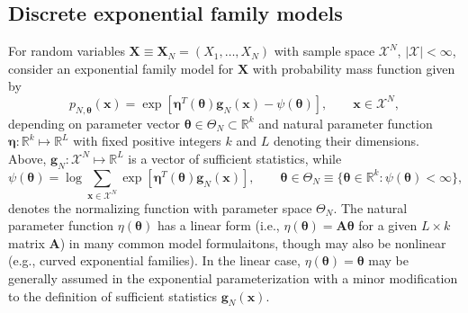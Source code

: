 \documentclass[]{article}
\theoremstyle{definition}
\begin{document}
\subsection{Discrete exponential family
models}\label{discrete-exponential-family-models}

For random variables
\(\boldsymbol X \equiv\boldsymbol X_N= (X_1, \dots, X_N)\) with sample
space \(\mathcal{X}^N\), \(|\mathcal{X}| < \infty\), consider an
exponential family model for \(\boldsymbol X\) with probability mass
function given by
\begin{equation}
\label{eq:expo}
p_{N, \boldsymbol \theta}(\boldsymbol x) = \exp\left[\boldsymbol\eta^T(\boldsymbol \theta) \boldsymbol g_N(\boldsymbol x) - \psi(\boldsymbol \theta)\right], \qquad \boldsymbol x \in \mathcal{X}^N,
\end{equation}
depending on parameter vector
\(\boldsymbol \theta \in \Theta_N \subset \mathbb{R}^{k}\) and natural
parameter function
\(\boldsymbol \eta : \mathbb{R}^k \mapsto \mathbb{R}^L\) with fixed
positive integers \(k\) and \(L\) denoting their dimensions. Above,
\(\boldsymbol g_N : \mathcal{X}^N \mapsto \mathbb{R}^L\) is a vector of
sufficient statistics, while \[
\psi(\boldsymbol \theta) = \log \sum\limits_{\boldsymbol x \in \mathcal{X}^N}\exp\left[\boldsymbol \eta^T(\boldsymbol \theta) \boldsymbol g_N(\boldsymbol x) \right], \qquad \boldsymbol \theta \in \Theta_N\equiv \{\boldsymbol \theta \in \mathbb{R}^k : \psi(\boldsymbol \theta) < \infty \},
\] denotes the normalizing function with parameter space \(\Theta_N\).
The natural parameter function \(\eta (\boldsymbol \theta)\) has a
linear form (i.e.,
\(\eta (\boldsymbol \theta)= \bm{A} \boldsymbol \theta\) for a given
\(L \times k\) matrix \(\bm{A}\)) in many common model formulaitons,
though may also be nonlinear (e.g., curved exponential families). In the
linear case, \(\eta (\boldsymbol \theta) = \boldsymbol \theta\) may be
generally assumed in the exponential parameterization with a minor
modification to the definition of sufficient statistics
\(\boldsymbol g_N(\boldsymbol x)\).
\end{document}
